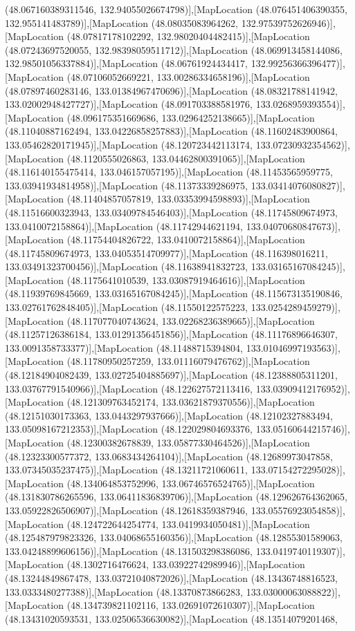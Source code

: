 (48.067160389311546, 132.94055026674798)],[MapLocation (48.076451406390355, 132.955141483789)],[MapLocation (48.08035083964262, 132.97539752626946)],[MapLocation (48.07817178102292, 132.98020404482415)],[MapLocation (48.07243697520055, 132.98398059511712)],[MapLocation (48.069913458144086, 132.98501056337884)],[MapLocation (48.06761924434417, 132.99256366396477)],[MapLocation (48.07106052669221, 133.00286334658196)],[MapLocation (48.07897460283146, 133.01384967470696)],[MapLocation (48.08321788141942, 133.02002948427727)],[MapLocation (48.091703388581976, 133.0268959393554)],[MapLocation (48.096175351669686, 133.02964252138665)],[MapLocation (48.11040887162494, 133.04226858257883)],[MapLocation (48.11602483900864, 133.05462820171945)],[MapLocation (48.120723442113174, 133.07230932354562)],[MapLocation (48.1120555026863, 133.04462800391065)],[MapLocation (48.116140155475414, 133.046157057195)],[MapLocation (48.11453565959775, 133.03941934814958)],[MapLocation (48.11373339286975, 133.03414076080827)],[MapLocation (48.11404857057819, 133.03353994598893)],[MapLocation (48.11516600323943, 133.03409784546403)],[MapLocation (48.11745809674973, 133.0410072158864)],[MapLocation (48.11742944621194, 133.04070680847673)],[MapLocation (48.11754404826722, 133.0410072158864)],[MapLocation (48.11745809674973, 133.04053514709977)],[MapLocation (48.116398016211, 133.03491323700456)],[MapLocation (48.11638941832723, 133.03165167084245)],[MapLocation (48.1175641010539, 133.03087919464616)],[MapLocation (48.11939769845669, 133.03165167084245)],[MapLocation (48.115673135190846, 133.02761762848405)],[MapLocation (48.11550122575223, 133.0254289459279)],[MapLocation (48.117077040743624, 133.02268236389665)],[MapLocation (48.11257126386184, 133.01291356451856)],[MapLocation (48.11176896646307, 133.0091358733377)],[MapLocation (48.11488715394804, 133.01046997193563)],[MapLocation (48.11780950257259, 133.01116079476762)],[MapLocation (48.12184904082439, 133.02725404885697)],[MapLocation (48.12388805311201, 133.03767791540966)],[MapLocation (48.122627572113416, 133.03909412176952)],[MapLocation (48.121309763452174, 133.03621879370556)],[MapLocation (48.12151030173363, 133.0443297937666)],[MapLocation (48.12102327883494, 133.05098167212353)],[MapLocation (48.122029804693376, 133.05160644215746)],[MapLocation (48.12300382678839, 133.05877330464526)],[MapLocation (48.12323300577372, 133.0683434264104)],[MapLocation (48.12689973047858, 133.07345035237475)],[MapLocation (48.13211721060611, 133.07154272295028)],[MapLocation (48.134064853752996, 133.06746576524765)],[MapLocation (48.131830786265596, 133.06411836839706)],[MapLocation (48.129626764362065, 133.05922826506907)],[MapLocation (48.12618359387946, 133.05576923054858)],[MapLocation (48.124722644254774, 133.0419934050481)],[MapLocation (48.125487979823326, 133.04068655160356)],[MapLocation (48.12855301589063, 133.04248899606156)],[MapLocation (48.131503298386086, 133.0419740119307)],[MapLocation (48.1302716476624, 133.03922742989946)],[MapLocation (48.13244849867478, 133.03721040872026)],[MapLocation (48.13436748816523, 133.0333480277388)],[MapLocation (48.13370873866283, 133.03000063088822)],[MapLocation (48.134739821102116, 133.02691072610307)],[MapLocation (48.13431020593531, 133.02506536630082)],[MapLocation (48.13514079201468, 